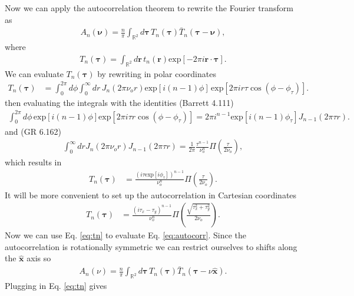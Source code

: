 \documentclass[]{osa-article}
\providecommand{\mb}[1]{\mathbf{#1}}
\providecommand{\mh}[1]{\mathbf{\hat{#1}}}
\providecommand{\mbb}[1]{\mathbb{#1}}
\providecommand{\bs}[1]{\boldsymbol{#1}}
\begin{document}
Now we can apply the autocorrelation theorem to rewrite the Fourier transform as
\begin{align}
  A_n(\bs{\nu}) = \frac{n}{\pi}\int_{\mbb{R}^2}d\bs{\tau}\, T_n(\bs{\tau})\bar{T}_n(\bs{\tau} - \bs{\nu}), \label{eq:autocorr}
\end{align}
where
\begin{align}
  T_n(\bs{\tau}) = \int_{\mbb{R}^2}d\mb{r}\, t_n(\mb{r})\text{exp}\left[-2\pi i\mb{r}\cdot\bs{\tau}\right]. \label{eq:tau}
\end{align}
We can evaluate $T_n(\bs{\tau})$ by rewriting in polar coordinates
\begin{align}
  T_n(\bs{\tau}) &= \int_0^{2\pi} d\phi \int_{0}^{\infty}dr\, J_n(2\pi\nu_o r)\text{exp}[i(n-1)\phi]\, \text{exp}\left[2\pi ir\tau\cos(\phi - \phi_{\tau})\right].
\end{align}
then evaluating the integrals with the identities (Barrett 4.111)
\begin{align}
  \int_0^{2\pi} d\phi\, \text{exp}[i(n-1)\phi]\text{exp}[2\pi i \tau r\cos(\phi - \phi_\tau)] = 2\pi i^{n-1}\text{exp}[i(n-1)\phi_\tau]J_{n-1}(2\pi \tau r).
\end{align}
and (GR 6.162)
\begin{align}
  \int_0^\infty dr J_n(2\pi\nu_o r)J_{n-1}(2\pi\tau r) = \frac{1}{2\pi}\frac{\tau^{n-1}}{\nu_o^n}\Pi\left(\frac{\tau}{2\nu_o}\right),
\end{align}
which results in 
\begin{align}
  T_n(\bs{\tau}) &= \frac{(i\tau\text{exp}[i\phi_\tau])^{n-1}}{\nu_o^n}\Pi\left(\frac{\tau}{2\nu_o}\right).
\end{align}
It will be more convenient to set up the autocorrelation in Cartesian coordinates 
\begin{align}
  T_n(\bs{\tau}) &= \frac{(i\tau_x - \tau_y)^{n-1}}{\nu_o^n}\Pi\left(\frac{\sqrt{\tau_x^2 + \tau_y^2}}{2\nu_o}\right). \label{eq:tn}
\end{align}
Now we can use Eq. \ref{eq:tn} to evaluate Eq. \ref{eq:autocorr}. Since the
autocorrelation is rotationally symmetric we can restrict ourselves to shifts
along the $\mh{x}$ axis so
\begin{align}
  A_n(\nu) = \frac{n}{\pi}\int_{\mbb{R}^2}d\bs{\tau}\, T_n(\bs{\tau})\bar{T}_n(\bs{\tau} - \nu\mh{x}).
\end{align}
Plugging in Eq. \ref{eq:tn} gives
\end{document}
